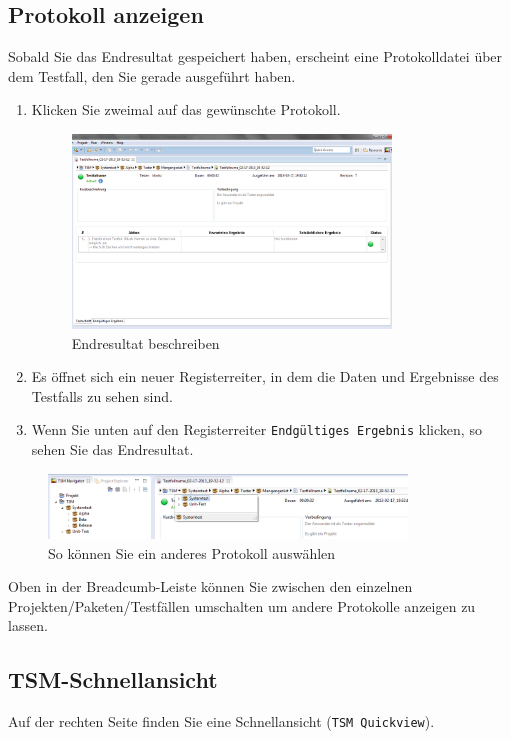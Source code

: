 \documentclass[11pt,a4paper,titlepage]{article}
\begin{document}
\subsection{Protokoll anzeigen}
Sobald Sie das Endresultat gespeichert haben, erscheint eine Protokolldatei über dem Testfall, den Sie gerade ausgeführt haben.
\begin{enumerate}
\item Klicken Sie zweimal auf das gewünschte Protokoll.

\begin{figure}[H]
\centering
\includegraphics[width= 320px]{BilderHandbuch/Protokoll/Protokoll.png}
\caption{Endresultat beschreiben}
\label{fig:Protokoll}
\end{figure}

\item Es öffnet sich ein neuer Registerreiter, in dem die Daten und Ergebnisse des Testfalls zu sehen sind.
\item Wenn Sie unten auf den Registerreiter \texttt{Endgültiges Ergebnis} klicken, so sehen Sie das Endresultat.
\end{enumerate}


\begin{figure}[H]
\centering
\includegraphics[width= 360px]{BilderHandbuch/Protokoll/Breadcrumb.png}
\caption{So können Sie ein anderes Protokoll auswählen}
\label{fig:Breadcrumb}
\end{figure}

Oben in der Breadcumb-Leiste können Sie zwischen den einzelnen Projekten/Paketen/Testfällen umschalten um andere Protokolle anzeigen zu lassen.

\subsection{TSM-Schnellansicht}
Auf der rechten Seite finden Sie eine Schnellansicht (\texttt{TSM Quickview}).
\end{document}
